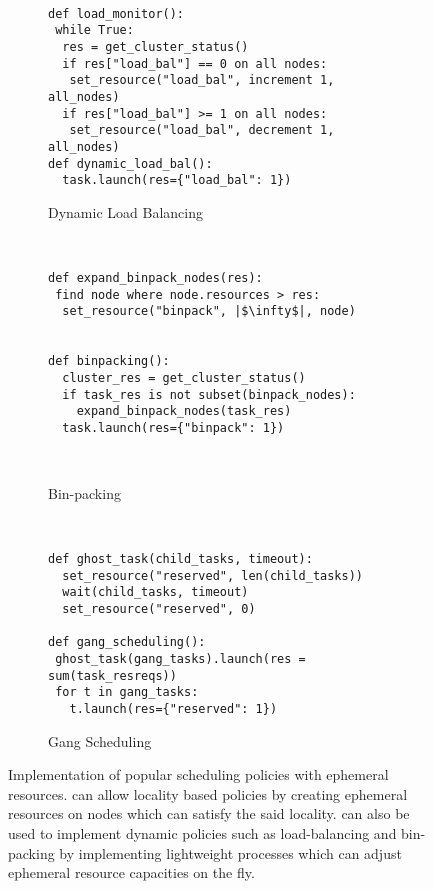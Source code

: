 \begin{figure*}[t]
\newline
\vspace{2.0mm}

~
~
\begin{subfigure}[b]{\colmult\textwidth}
  \centering
  \begin{verbatim}
def load_monitor():
 while True:
  res = get_cluster_status()
  if res["load_bal"] == 0 on all nodes:
   set_resource("load_bal", increment 1, all_nodes)
  if res["load_bal"] >= 1 on all nodes:
   set_resource("load_bal", decrement 1, all_nodes)
def dynamic_load_bal():
  task.launch(res={"load_bal": 1})
  \end{verbatim}
  \caption{Dynamic Load Balancing}
  \label{fig:policycode:dynloadbal}
\end{subfigure}
~
~
\begin{subfigure}[b]{\colmult\textwidth}
  \centering
  \begin{verbatim}
def expand_binpack_nodes(res):
 find node where node.resources > res:
  set_resource("binpack", |$\infty$|, node)


def binpacking():
  cluster_res = get_cluster_status()
  if task_res is not subset(binpack_nodes):
    expand_binpack_nodes(task_res)
  task.launch(res={"binpack": 1})
  
  
  \end{verbatim}
  \caption{Bin-packing}
  \label{fig:policycode:binpacking}
\end{subfigure}
~
~
\begin{subfigure}[b]{\colmult\textwidth}
  \centering
  \begin{verbatim}
def ghost_task(child_tasks, timeout):
  set_resource("reserved", len(child_tasks))
  wait(child_tasks, timeout)
  set_resource("reserved", 0)

def gang_scheduling():
 ghost_task(gang_tasks).launch(res = sum(task_resreqs))
 for t in gang_tasks: 
   t.launch(res={"reserved": 1})
  \end{verbatim}
  \caption{Gang Scheduling}
  \label{fig:policycode:gangsched}
\end{subfigure}

\caption{Implementation of popular scheduling policies with ephemeral resources. \name{} can allow locality based policies by creating ephemeral resources on nodes which can satisfy the said locality. \name{} can also be used to implement dynamic policies such as load-balancing and bin-packing by implementing lightweight processes which can adjust ephemeral resource capacities on the fly.}
\label{fig:policycode}
\end{figure*}